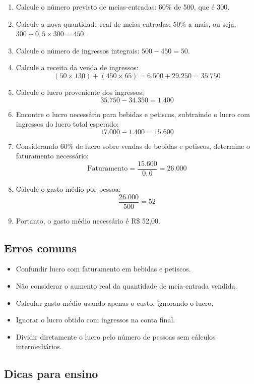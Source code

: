 \documentclass{article}
\begin{document}
\begin{enumerate}
  \item Calcule o número previsto de meias-entradas: $60\%$ de 500, que é 300.
  \item Calcule a nova quantidade real de meias-entradas: 50\% a mais, ou seja, $300 + 0{,}5 \times 300 = 450$.
  \item Calcule o número de ingressos integrais: $500 - 450 = 50$.
  \item Calcule a receita da venda de ingressos:
  \[
  (50 \times 130) + (450 \times 65) = 6.500 + 29.250 = 35.750
  \]
  \item Calcule o lucro proveniente dos ingressos:
  \[
  35.750 - 34.350 = 1.400
  \]
  \item Encontre o lucro necessário para bebidas e petiscos, subtraindo o lucro com ingressos do lucro total esperado:
  \[
  17.000 - 1.400 = 15.600
  \]
  \item Considerando 60\% de lucro sobre vendas de bebidas e petiscos, determine o faturamento necessário:
  \[
  \text{Faturamento} = \frac{15.600}{0{,}6} = 26.000
  \]
  \item Calcule o gasto médio por pessoa:
  \[
  \frac{26.000}{500} = 52
  \]
  \item Portanto, o gasto médio necessário é R\$ 52,00.
\end{enumerate}

\subsection*{Erros comuns}

\begin{itemize}
  \item Confundir lucro com faturamento em bebidas e petiscos.
  \item Não considerar o aumento real da quantidade de meia-entrada vendida.
  \item Calcular gasto médio usando apenas o custo, ignorando o lucro.
  \item Ignorar o lucro obtido com ingressos na conta final.
  \item Dividir diretamente o lucro pelo número de pessoas sem cálculos intermediários.
\end{itemize}

\subsection*{Dicas para ensino}
\end{document}

